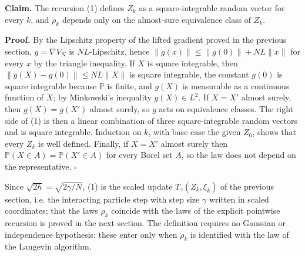 \documentclass[11pt,a4paper]{report}
\begin{document}
\textbf{Claim.} The recursion (1) defines \(Z_k\) as a square-integrable random vector for every \(k\), and \(\rho_k\) depends only on the almost-sure equivalence class of \(Z_k\).




\textbf{Proof.} By the Lipschitz property of the lifted gradient proved in the previous section, \(g=\nabla V_N\) is \(NL\)-Lipschitz, hence \(\|g(x)\|\le\|g(0)\|+NL\|x\|\) for every \(x\) by the triangle inequality. If \(X\) is square integrable, then \(\|g(X)-g(0)\|\le NL\|X\|\) is square integrable, the constant \(g(0)\) is square integrable because \(\mathbb P\) is finite, and \(g(X)\) is measurable as a continuous function of \(X\); by Minkowski's inequality \(g(X)\in L^2\). If \(X=X'\) almost surely, then \(g(X)=g(X')\) almost surely, so \(g\) acts on equivalence classes. The right side of (1) is then a linear combination of three square-integrable random vectors and is square integrable. Induction on \(k\), with base case the given \(Z_0\), shows that every \(Z_k\) is well defined. Finally, if \(X=X'\) almost surely then \(\mathbb P(X\in A)=\mathbb P(X'\in A)\) for every Borel set \(A\), so the law does not depend on the representative. \(\square\)




Since \(\sqrt{2h}=\sqrt{2\gamma/N}\), (1) is the scaled update \(T_\gamma(Z_k,\xi_k)\) of the previous section, i.e. the interacting particle step with step size \(\gamma\) written in scaled coordinates; that the laws \(\rho_k\) coincide with the laws of the explicit pointwise recursion is proved in the next section. The definition requires no Gaussian or independence hypothesis: these enter only when \(\rho_k\) is identified with the law of the Langevin algorithm.
\end{document}
